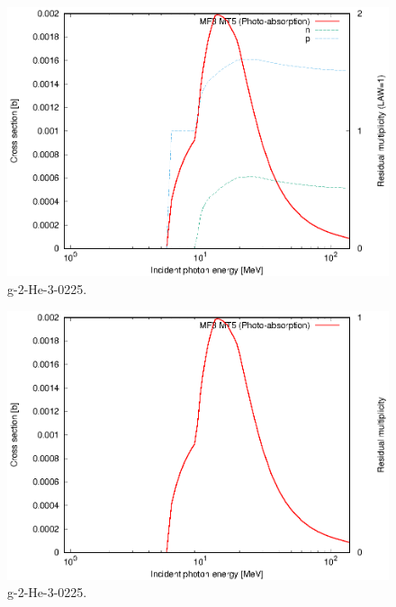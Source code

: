 \begin{figure}
 \includegraphics[width=\linewidth]{eps/g_2-He-3_0225.eps}
  \caption{g-2-He-3-0225.}
\end{figure}
\begin{figure}
 \includegraphics[width=\linewidth]{eps-law0/g_2-He-3_0225.eps}
 \caption{g-2-He-3-0225.}
\end{figure}
\newpage \clearpage

